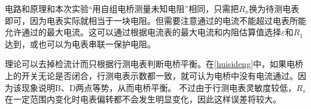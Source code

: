 \documentclass[]{../template/Report}%
\begin{document}
\begin{fullreportonly}
    电路和原理和本次实验“用自组电桥测量未知电阻”相同，只需把$R_x$换为待测电表即可，因为电表实际就相当于一块电阻。但需要注意通过的电流不能超过电表所能允许通过的最大电流。这可以通过根据电流表的最大电流和内阻估算值选择$\varepsilon$和$R_1$达到，或也可以为电表串联一保护电阻。

    理论可以去掉检流计而只根据行测电表判断电桥平衡。在\cref{huisideng}中，如果电桥上的开关无论是否闭合，行测电表示数都一致，就可认为电桥中没有电流通过。因为该现象说明B、D两点等势，从而电桥平衡。
    不过由于行测电表灵敏度较低，$R_s$在一定范围内变化时电表偏转都不会发生明显变化，因此这样误差将较大。

\end{fullreportonly}
\insertnotes
\end{document}
